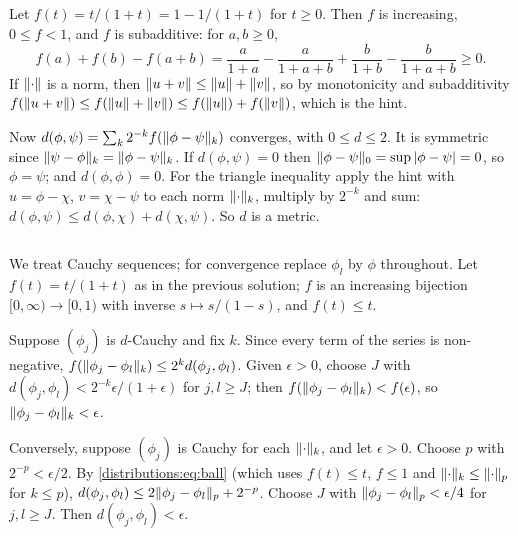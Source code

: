 \subsection*{}
Let $f(t)=t/(1+t)=1-1/(1+t)$ for $t\ge0$. Then $f$ is increasing, $0\le f<1$, and $f$
is subadditive: for $a,b\ge0$,
\[
  f(a)+f(b)-f(a+b)=\frac a{1+a}-\frac a{1+a+b}+\frac b{1+b}-\frac b{1+a+b}\ge0.
\]
If $\lVert \cdot\rVert$ is a norm, then $\lVert u+v\rVert\le\lVert u\rVert+\lVert v\rVert$, so by monotonicity
and subadditivity $f(\lVert u+v\rVert)\le f(\lVert u\rVert+\lVert v\rVert)\le f(\lVert u\rVert)+f(\lVert v\rVert)$, which
is the hint.

Now $d(\phi,\psi)=\sum_k2^{-k}f(\lVert \phi-\psi\rVert_k)$ converges, with $0\le d\le2$. It is
symmetric since $\lVert \psi-\phi\rVert_k=\lVert \phi-\psi\rVert_k$. If $d(\phi,\psi)=0$ then
$\lVert \phi-\psi\rVert_0=\sup|\phi-\psi|=0$, so $\phi=\psi$; and $d(\phi,\phi)=0$. For the
triangle inequality apply the hint with $u=\phi-\chi$, $v=\chi-\psi$ to each norm
$\lVert \cdot\rVert_k$, multiply by $2^{-k}$ and sum:
$d(\phi,\psi)\le d(\phi,\chi)+d(\chi,\psi)$. So $d$ is a metric.

\subsection*{}
We treat Cauchy sequences; for convergence replace $\phi_l$ by $\phi$ throughout. Let
$f(t)=t/(1+t)$ as in the previous solution; $f$ is an increasing bijection
$[0,\infty)\to[0,1)$ with inverse $s\mapsto s/(1-s)$, and $f(t)\le t$.

Suppose $(\phi_j)$ is $d$-Cauchy and fix $k$. Since every term of the series is
non-negative, $f(\lVert \phi_j-\phi_l\rVert_k)\le2^kd(\phi_j,\phi_l)$. Given $\epsilon>0$,
choose $J$ with $d(\phi_j,\phi_l)<2^{-k}\epsilon/(1+\epsilon)$ for $j,l\ge J$; then
$f(\lVert \phi_j-\phi_l\rVert_k)<f(\epsilon)$, so $\lVert \phi_j-\phi_l\rVert_k<\epsilon$.

Conversely, suppose $(\phi_j)$ is Cauchy for each $\lVert \cdot\rVert_k$, and let $\epsilon>0$.
Choose $p$ with $2^{-p}<\epsilon/2$. By \eqref{distributions:eq:ball} (which uses
$f(t)\le t$, $f\le1$ and $\lVert \cdot\rVert_k\le\lVert \cdot\rVert_p$ for $k\le p$),
$d(\phi_j,\phi_l)\le2\lVert \phi_j-\phi_l\rVert_p+2^{-p}$. Choose $J$ with
$\lVert \phi_j-\phi_l\rVert_p<\epsilon/4$ for $j,l\ge J$. Then $d(\phi_j,\phi_l)<\epsilon$.

